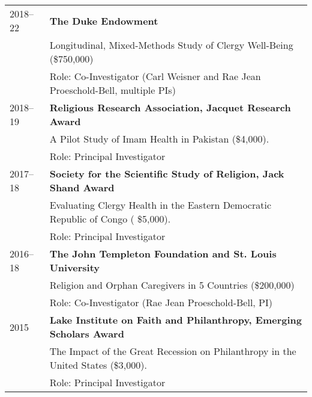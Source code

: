 \begin{longtable}{p{} p{}}
2018--22 & \textbf{The Duke Endowment}\\
& Longitudinal, Mixed-Methods Study of Clergy Well-Being (\$750,000)\\
& Role: Co-Investigator (Carl Weisner and Rae Jean Proeschold-Bell, multiple PIs)\\

2018--19 & \textbf{Religious Research Association, Jacquet Research Award}\\
& A Pilot Study of Imam Health in Pakistan (\$4,000). \\
& Role: Principal Investigator\\

2017--18 & \textbf{Society for the Scientific Study of Religion, Jack Shand Award} \\
& Evaluating Clergy Health in the Eastern Democratic Republic of Congo ( \$5,000). \\
& Role: Principal Investigator\\

2016--18 & \textbf{The John Templeton Foundation and St. Louis University}\\
& Religion and Orphan Caregivers in 5 Countries (\$200,000)\\
& Role: Co-Investigator (Rae Jean Proeschold-Bell, PI)\\

2015 & \textbf{Lake Institute on Faith and Philanthropy, Emerging Scholars Award} \\
& The Impact of the Great Recession on Philanthropy in the United States (\$3,000). \\
& Role: Principal Investigator\\
\end{longtable}